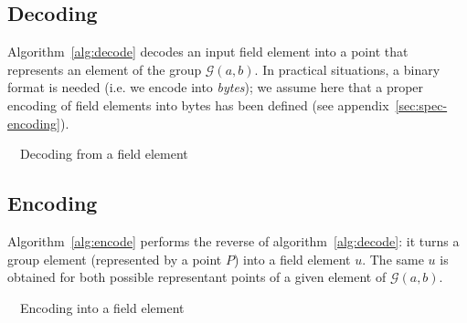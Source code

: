 \documentclass{llncs}
\newcommand{\bF}{\mathbb{F}}
\newcommand{\cG}{\mathcal{G}}
\newcommand{\sign}{\text{\textsf{sign}}}
\begin{document}
\subsection{Decoding}\label{sec:form-decoding}

Algorithm~\ref{alg:decode} decodes an input field element into a point
that represents an element of the group $\cG(a,b)$. In practical
situations, a binary format is needed (i.e. we encode into
\emph{bytes}); we assume here that a proper encoding of field elements
into bytes has been defined (see appendix~\ref{sec:spec-encoding}).

\begin{algorithm}[H]
    \caption{\ \ Decoding from a field element}\label{alg:decode}
    \begin{algorithmic}[1]
        \Require{$u \in \bF_q$}
        \EndIf
        \If{$\sign(E) = 1$}
        \EndIf
    \end{algorithmic}
\end{algorithm}

\subsection{Encoding}\label{sec:form-encoding}

Algorithm~\ref{alg:encode} performs the reverse of
algorithm~\ref{alg:decode}: it turns a group element (represented by a
point $P$) into a field element $u$. The same $u$ is obtained for both
possible representant points of a given element of $\cG(a,b)$.

\begin{algorithm}[H]
    \caption{\ \ Encoding into a field element}\label{alg:encode}
    \begin{algorithmic}[1]
        \Ensure{$u \in \bF_q$}
        \If{$\sign(KE) = 1$}
        \EndIf
    \end{algorithmic}
\end{algorithm}
\end{document}
